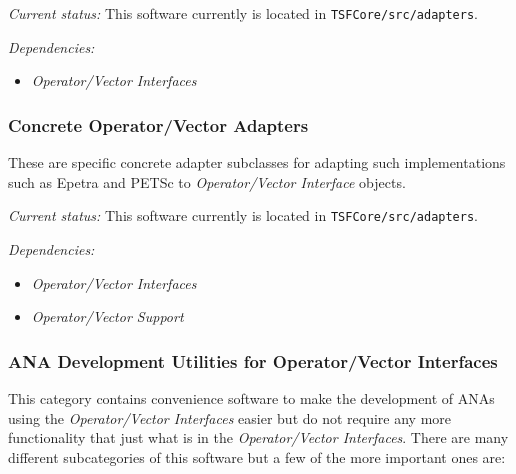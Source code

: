 \documentclass[pdf,ps2pdf,11pt]{SANDreport}
\begin{document}
{}\textit{Current status:} This software currently is located in
{}\texttt{TSFCore/src/adapters}.

{}\textit{Dependencies:}
\begin{itemize}
\item {}\textit{Operator/Vector Interfaces}
\end{itemize}

%
\subsubsection{Concrete Operator/Vector Adapters}
%

These are specific concrete adapter subclasses for adapting such
implementations such as Epetra and PETSc to {}\textit{Operator/Vector
Interface} objects.

{}\textit{Current status:} This software currently is located in
{}\texttt{TSFCore/src/adapters}.

{}\textit{Dependencies:}
\begin{itemize}
\item {}\textit{Operator/Vector Interfaces}
\item {}\textit{Operator/Vector Support}
\end{itemize}

%
\subsubsection{ANA Development Utilities for Operator/Vector Interfaces}
%

This category contains convenience software to make the development of ANAs
using the {}\textit{Operator/Vector Interfaces} easier but do not require
any more functionality that just what is in the {}\textit{Operator/Vector
Interfaces}.  There are many different subcategories of this software but a
few of the more important ones are:
\end{document}

